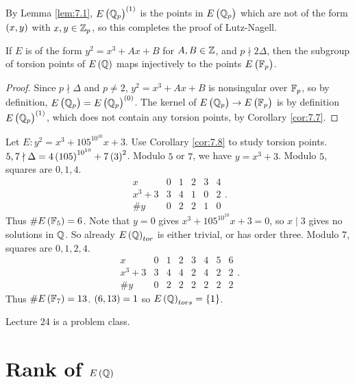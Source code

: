 By Lemma \ref{lem:7.1}, $ E\br{\Q_p}^{\br{1}} $ is the points in $ E\br{\Q_p} $ which are not of the form $ \br{x, y} $ with $ x, y \in \mathbb{Z}_p $, so this completes the proof of Lutz-Nagell.

\begin{corollary}
\label{cor:7.8}
If $ E $ is of the form $ y^2 = x^3 + Ax + B $ for $ A, B \in \mathbb{Z} $, and $ p \nmid 2\Delta $, then the subgroup of torsion points of $ E\br{\Q} $ maps injectively to the points $ E\br{\F_p} $.
\end{corollary}

\begin{proof}
Since $ p \nmid \Delta $ and $ p \ne 2 $, $ y^2 = x^3 + Ax + B $ is nonsingular over $ \mathbb{F}_p $, so by definition, $ E\br{\Q_p} = E\br{\Q_p}^{\br{0}} $. The kernel of $ E\br{\Q_p} \to E\br{\F_p} $ is by definition $ E\br{\Q_p}^{\br{1}} $, which does not contain any torsion points, by Corollary \ref{cor:7.7}.
\end{proof}

\begin{example*}
Let $ E : y^2 = x^3 + 105^{10^{10}}x + 3 $. Use Corollary \ref{cor:7.8} to study torsion points. $ 5, 7 \nmid \Delta = 4\br{105}^{10^{10}} + 7\br{3}^2 $. Modulo $ 5 $ or $ 7 $, we have $ y = x^3 + 3 $. Modulo $ 5 $, squares are $ 0, 1, 4 $.
$$
\begin{array}{c|ccccc}
x & 0 & 1 & 2 & 3 & 4 \\
\hline
x^3 + 3 & 3 & 4 & 1 & 0 & 2 \\
\#y & 0 & 2 & 2 & 1 & 0
\end{array}.
$$
Thus $ \#E\br{\F_5} = 6 $. Note that $ y = 0 $ gives $ x^3 + 105^{10^{10}}x + 3 = 0 $, so $ x \mid 3 $ gives no solutions in $ \mathbb{Q} $. So already $ E\br{\Q}_{tor} $ is either trivial, or has order three. Modulo $ 7 $, squares are $ 0, 1, 2, 4 $.
$$
\begin{array}{c|ccccccc}
x & 0 & 1 & 2 & 3 & 4 & 5 & 6 \\
\hline
x^3 + 3 & 3 & 4 & 4 & 2 & 4 & 2 & 2 \\
\#y & 0 & 2 & 2 & 2 & 2 & 2 & 2
\end{array}.
$$
Thus $ \#E\br{\F_7} = 13 $. $ \br{6, 13} = 1 $ so $ E\br{\Q}_{tors} = \cbr{1} $.
\end{example*}


Lecture 24 is a problem class.

\pagebreak

\section{Rank of \texorpdfstring{$ E\br{\Q} $}{E(Q)}}

